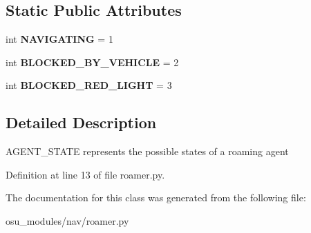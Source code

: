 \subsection*{Static Public Attributes}
\begin{DoxyCompactItemize}
\item 
\mbox{\label{classscripts_1_1osu__modules_1_1nav_1_1roamer_1_1__AgentState_ad4d7451ce9be373b784c07eb7dbd4c21}} 
int {\bfseries N\+A\+V\+I\+G\+A\+T\+I\+NG} = 1
\item 
\mbox{\label{classscripts_1_1osu__modules_1_1nav_1_1roamer_1_1__AgentState_a5defe35453ddb81d1eb2ffaab7339c1e}} 
int {\bfseries B\+L\+O\+C\+K\+E\+D\+\_\+\+B\+Y\+\_\+\+V\+E\+H\+I\+C\+LE} = 2
\item 
\mbox{\label{classscripts_1_1osu__modules_1_1nav_1_1roamer_1_1__AgentState_ae292db8d750efc3cfb3b1071b07aa81a}} 
int {\bfseries B\+L\+O\+C\+K\+E\+D\+\_\+\+R\+E\+D\+\_\+\+L\+I\+G\+HT} = 3
\end{DoxyCompactItemize}


\subsection{Detailed Description}
\begin{DoxyVerb}AGENT_STATE represents the possible states of a roaming agent
\end{DoxyVerb}
 

Definition at line 13 of file roamer.\+py.



The documentation for this class was generated from the following file\+:\begin{DoxyCompactItemize}
\item 
osu\+\_\+modules/nav/roamer.\+py\end{DoxyCompactItemize}
